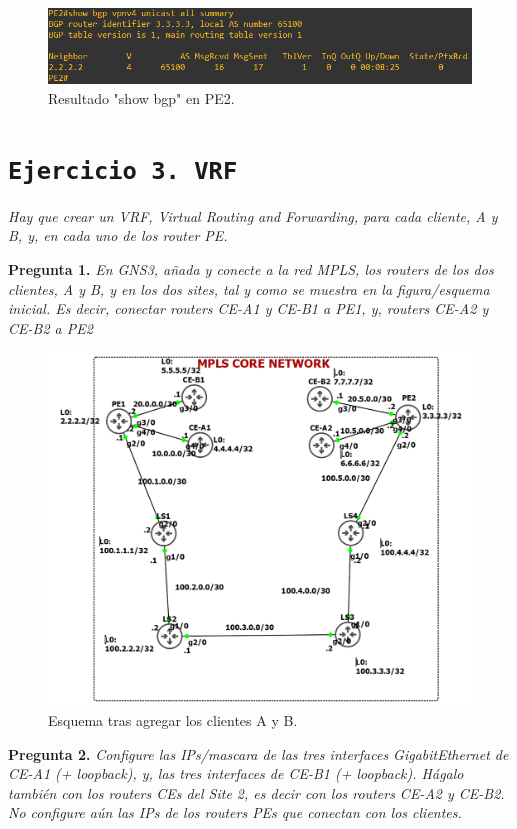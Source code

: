 \documentclass[a4paper, 12pt]{report}
\begin{document}
\begin{figure}[H]
	\centering
	\includegraphics[scale=0.7]{bgppe2.png}
	\caption{Resultado "show bgp" en PE2.}
	\label{fig:bgppe2}
\end{figure}

\newpage
\section{\texttt{Ejercicio 3. VRF}}

\textit{Hay que crear un VRF, Virtual Routing and Forwarding, para cada cliente, A y B, y, en cada uno de los router PE.}

\textbf{Pregunta 1.}
\textit{
	En GNS3, añada y conecte a la red MPLS, los routers de los dos clientes, A y B, y en los dos
sites, tal y como se muestra en la figura/esquema inicial. Es decir, conectar routers CE-A1 y
CE-B1 a PE1, y, routers CE-A2 y CE-B2 a PE2
}

\begin{figure}[H]
	\centering
	\includegraphics[scale=0.5]{maqueta2.png}
	\caption{Esquema tras agregar los clientes A y B.}
	\label{fig:maqueta2}
\end{figure}
\newpage
\textbf{Pregunta 2.}
\textit{Configure las IPs/mascara de las tres interfaces GigabitEthernet de CE-A1 (+ loopback), y, las
tres interfaces de CE-B1 (+ loopback). Hágalo también con los routers CEs del Site 2, es decir
con los routers CE-A2 y CE-B2. No configure aún las IPs de los routers PEs que conectan
con los clientes.}
\end{document}
